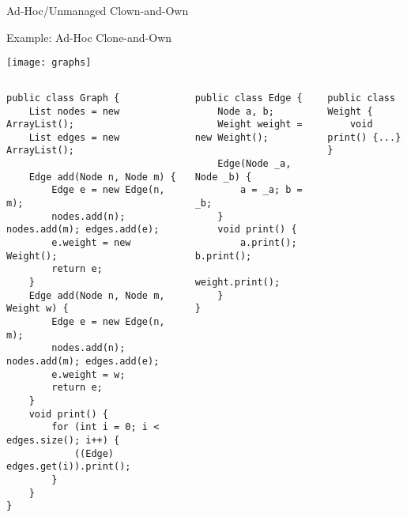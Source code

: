 \begin{frame}{Ad-Hoc/Unmanaged Clown-and-Own}
	\begin{mycolumns}[columns=2,widths={50,50},animation=none]
		\vspace{3mm}		
	\mynextcolumn
	\end{mycolumns}	
\end{frame}

\begin{frame}[fragile]{Example: Ad-Hoc Clone-and-Own}
	\vspace{-1.2cm}
	\begin{flushright}
		\texttt{[image: graphs]}		
	\end{flushright}
	\vspace{0.1cm}
	\begin{tiny}
		\begin{columns}
				\vspace{-15mm}
\vspace{3mm}				
\begin{lstlisting}
public class Graph {
	List nodes = new ArrayList();
	List edges = new ArrayList();

	Edge add(Node n, Node m) {
		Edge e = new Edge(n, m);
		nodes.add(n); nodes.add(m); edges.add(e);
		e.weight = new Weight();
		return e;
	}
	Edge add(Node n, Node m, Weight w) {
		Edge e = new Edge(n, m);
		nodes.add(n); nodes.add(m); edges.add(e);
		e.weight = w;
		return e;
	}
	void print() {
		for (int i = 0; i < edges.size(); i++) {
			((Edge) edges.get(i)).print();
		}
	}
}
\end{lstlisting}
\begin{lstlisting}
public class Edge {
	Node a, b;
	Weight weight = new Weight();

	Edge(Node _a, Node _b) {
		a = _a; b = _b;
	}
	void print() {
		a.print(); b.print();
		weight.print();
	}
}
\end{lstlisting}
\begin{lstlisting}
public class Weight {
	void print() {...}
}
\end{lstlisting}
		\end{columns}
	\end{tiny}
\end{frame}

